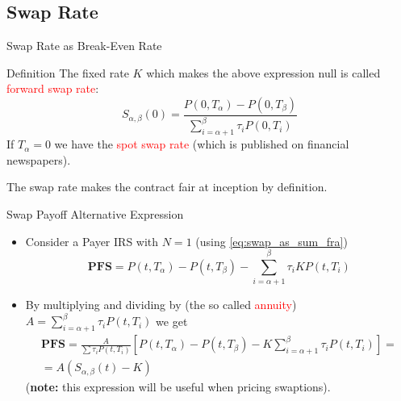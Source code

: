 \documentclass{beamer}
\begin{document}
\subsection{Swap Rate}
\begin{frame}{Swap Rate as Break-Even Rate}
	\begin{block}{Definition}
	The fixed rate $K$ which makes the above expression null is called \textcolor{red}{forward swap rate}:
	\begin{equation}
		S_{\alpha,\beta}(0) = \frac{P(0, T_\alpha)-P(0,T_\beta)}{\sum_{i=\alpha+1}^{\beta}\tau_iP(0,T_i)}
	\end{equation}
	If $T_\alpha=0$ we have the \textcolor{red}{spot swap rate} (which is published on financial newspapers).
	\end{block}
	The swap rate makes the contract fair at inception by definition.
\end{frame}

\begin{frame}{Swap Payoff Alternative Expression}
	\begin{itemize}
		\item<1-> Consider a Payer IRS with $N=1$ (using \cref{eq:swap_as_sum_fra})
		\begin{equation*}
			\textbf{PFS} = P(t,T_\alpha)-P(t,T_\beta)-\sum_{i=\alpha+1}^{\beta}\tau_iKP(t,T_i)
		\end{equation*}
		\item<2-> By multiplying and dividing by (the so called \textcolor{red}{annuity}) $A = \sum_{i=\alpha+1}^{\beta}\tau_iP(t, T_i)$
		we get
		\begin{equation}
			\begin{gathered}
			\textbf{PFS}=\frac{A}{\sum\tau_iP(t, T_i)}\left[P(t,T_\alpha)-P(t,T_\beta)-K\sum_{i=\alpha+1}^{\beta}\tau_i P(t,T_i)\right]=\\
			= \boxed{A (S_{\alpha,\beta}(t)-K)}
			\end{gathered}
		\label{eq:swap_payoff_with_swap_rate}
		\end{equation}
		(\textbf{note:} this expression will be useful when pricing swaptions).
	\end{itemize}
\end{frame}
\end{document}
